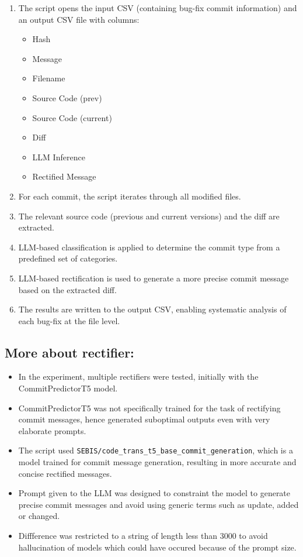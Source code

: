 \documentclass[12pt,a4paper]{article}
\begin{document}
        \begin{enumerate}
            \item The script opens the input CSV (containing bug-fix commit information) and an output CSV file with columns:
            \begin{itemize}
                \item Hash
                \item Message
                \item Filename
                \item Source Code (prev)
                \item Source Code (current)
                \item Diff
                \item LLM Inference
                \item Rectified Message
            \end{itemize}
            
            \item For each commit, the script iterates through all modified files.
            
            \item The relevant source code (previous and current versions) and the diff are extracted.
            
            \item LLM-based classification is applied to determine the commit type from a predefined set of categories.
            
            \item LLM-based rectification is used to generate a more precise commit message based on the extracted diff.
            
            \item The results are written to the output CSV, enabling systematic analysis of each bug-fix at the file level.
        \end{enumerate}
\subsection{More about rectifier:}
\begin{itemize}
    \item In the experiment, multiple rectifiers were tested, initially with the CommitPredictorT5 model.
    \item CommitPredictorT5 was not specifically trained for the task of rectifying commit messages, hence generated suboptimal outputs even with very elaborate prompts.
    \item The script used \texttt{SEBIS/code\_trans\_t5\_base\_commit\_generation}, which is a model trained for commit message generation, resulting in more accurate and concise rectified messages.
    \item Prompt given to the LLM was designed to constraint the model to generate precise commit messages and avoid using generic terms such as update, added or changed.
    \item Diffference was restricted to a string of length less than 3000 to avoid hallucination of models which could have occured because of the prompt size.
\end{itemize}
\end{document}
